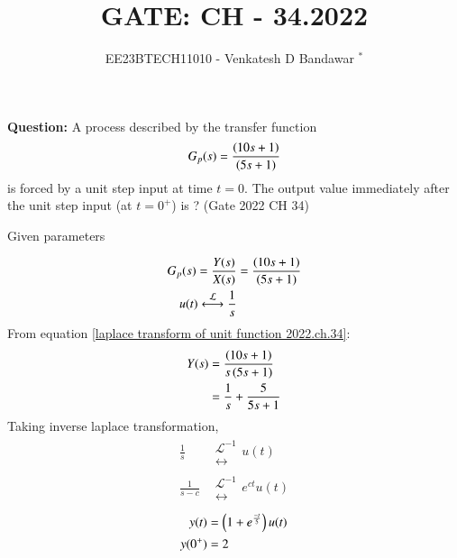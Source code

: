 \documentclass[journal,12pt,twocolumn]{IEEEtran}
\theoremstyle{remark}
\begin{document}

\vspace{3cm}

\title{GATE: CH - 34.2022}
\author{EE23BTECH11010 - Venkatesh D Bandawar $^{*}$%
}
\maketitle
\bigskip


\textbf{Question:} A process described by the transfer function
\begin{align}
    G_p(s) = \frac{\left(10s+1\right)}{\left(5s+1\right)} \nonumber
\end{align}
is forced by a unit step input at time $t = 0$. The output value immediately after the unit step input (at $t = 0^+$) is ? \hfill(Gate 2022 CH 34)\\
\solution
\begin{table}[!h] 
\centering

\caption{Given parameters}
\label{given parameters list.gate.2022.ch.34}
\end{table}
\begin{align}
    G_p(s) = \frac{Y(s)}{X(s)} &= \frac{\brak{10s+1}}{\brak{5s+1}}\\
    u(t) \system{\mathcal{L}} \frac{1}{s} \label{laplace transform of unit function 2022.ch.34}
\end{align}
From equation \eqref{laplace transform of unit function 2022.ch.34}:
\begin{align}
    Y(s) &= \frac{\left(10s+1\right)}{s\left(5s+1\right)}\\
    &= \frac{1}{s} + \frac{5}{5s+1}
\end{align}
Taking inverse laplace transformation, 
\begin{align}
    \frac{1}{s} &\mathrel{\substack{\mathcal{L}^{-1}\\\longleftrightarrow}} u(t)\\
    \frac{1}{s-c} &\mathrel{\substack{\mathcal{L}^{-1}\\\longleftrightarrow}} e^{ct} u(t)
\end{align}
\begin{align}
    y(t) &= \left(1 + e^{\frac{-t}{5}}\right)u(t)\\
    y(0^+) &= 2
\end{align}
\end{document}
